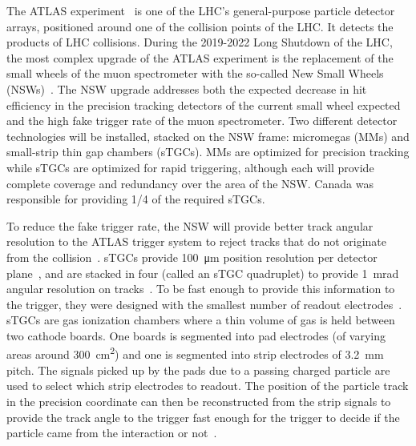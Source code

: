 The ATLAS experiment~\cite{collaboration_atlas_2008} is one of the LHC's general-purpose particle detector arrays, positioned around one of the collision points of the LHC. It detects the products of LHC collisions. During the 2019-2022 Long Shutdown of the LHC, the most complex upgrade of the ATLAS experiment is the replacement of the small wheels of the muon spectrometer with the so-called New Small Wheels (NSWs)~\cite{nsw_tdr}. The NSW upgrade addresses both the expected decrease in hit efficiency in the precision tracking detectors of the current small wheel expected and the high fake trigger rate of the muon spectrometer. Two different detector technologies will be installed, stacked on the NSW frame: micromegas (MMs) and small-strip thin gap chambers (sTGCs). MMs are optimized for precision tracking while sTGCs are optimized for rapid triggering, although each will provide complete coverage and redundancy over the area of the NSW. Canada was responsible for providing 1/4 of the required sTGCs.

To reduce the fake trigger rate, the NSW will provide better track angular resolution to the ATLAS trigger system to reject tracks that do not originate from the collision~\cite{nsw_tdr}. sTGCs provide \SI{100}{\micro\meter} position resolution per detector plane~\cite{abusleme_performance_2016}, and are stacked in four (called an sTGC quadruplet) to provide \SI{1}{mrad} angular resolution on tracks~\cite{nsw_tdr, perez-codina_small-strip_2016}. To be fast enough to provide this information to the trigger, they were designed with the smallest number of readout electrodes~\cite{nsw_tdr}. sTGCs are gas ionization chambers where a thin volume of gas is held between two cathode boards. One boards is segmented into pad electrodes (of varying areas around \SI{300}{\centi\meter\squared}) and one is segmented into strip electrodes of \SI{3.2}{mm} pitch. The signals picked up by the pads due to a passing charged particle are used to select which strip electrodes to readout. The position of the particle track in the precision coordinate can then be reconstructed from the strip signals to provide the track angle to the trigger fast enough for the trigger to decide if the particle came from the interaction or not~\cite{nsw_tdr}.


